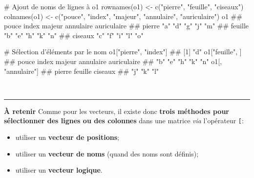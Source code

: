 \documentclass[12pt,twosided, notitlepage]{book}
\newenvironment{Shaded}{}{}
\newcommand{\CommentTok}[1]{\textcolor[rgb]{0.00,0.50,0.00}{#1}}
\newcommand{\KeywordTok}[1]{\textcolor[rgb]{0.00,0.00,1.00}{#1}}
\newcommand{\NormalTok}[1]{#1}
\newcommand{\StringTok}[1]{\textcolor[rgb]{0.00,0.50,0.50}{#1}}
\providecommand{\tightlist}{%
  \setlength{\itemsep}{0pt}\setlength{\parskip}{0pt}}
\renewenvironment{Shaded}{\begin{snugshade}}{\end{snugshade}}
\begin{document}
\begin{Shaded}
\begin{Highlighting}[]
\CommentTok{# Ajout de noms de lignes à o1}
\KeywordTok{rownames}\NormalTok{(o1) <-}\StringTok{ }\KeywordTok{c}\NormalTok{(}\StringTok{"pierre"}\NormalTok{, }\StringTok{"feuille"}\NormalTok{, }\StringTok{"ciseaux"}\NormalTok{)}
\KeywordTok{colnames}\NormalTok{(o1) <-}\StringTok{ }\KeywordTok{c}\NormalTok{(}\StringTok{"pouce"}\NormalTok{, }\StringTok{"index"}\NormalTok{, }\StringTok{"majeur"}\NormalTok{, }\StringTok{"annulaire"}\NormalTok{, }\StringTok{"auriculaire"}\NormalTok{)}
\NormalTok{o1}
\NormalTok{  ##         pouce index majeur annulaire auriculaire}
\NormalTok{  ## pierre  "a"   "d"   "g"    "j"       "m"        }
\NormalTok{  ## feuille "b"   "e"   "h"    "k"       "n"        }
\NormalTok{  ## ciseaux "c"   "f"   "i"    "l"       "o"}

\CommentTok{# Sélection d'éléments par le nom}
\NormalTok{o1[}\StringTok{"pierre"}\NormalTok{, }\StringTok{"index"}\NormalTok{]}
\NormalTok{  ## [1] "d"}
\NormalTok{o1[}\StringTok{"feuille"}\NormalTok{, ]}
\NormalTok{  ##       pouce       index      majeur   annulaire auriculaire }
\NormalTok{  ##         "b"         "e"         "h"         "k"         "n"}
\NormalTok{o1[, }\StringTok{"annulaire"}\NormalTok{]}
\NormalTok{  ##  pierre feuille ciseaux }
\NormalTok{  ##     "j"     "k"     "l"}
\end{Highlighting}
\end{Shaded}

~

\begin{center}\rule{0.5\linewidth}{\linethickness}\end{center}

\textbf{À retenir} Comme pour les vecteurs, il existe donc \textbf{trois
méthodes pour sélectionner des lignes ou des colonnes} dans une matrice
\emph{via} l'opérateur \texttt{{[}}\index{\texttt{[}}:

\begin{itemize}
\tightlist
\item
  utiliser un \textbf{vecteur de positions};
\item
  utiliser un \textbf{vecteur de noms} (quand des noms sont définis);
\item
  utiliser un \textbf{vecteur logique}.
\end{itemize}
\end{document}
